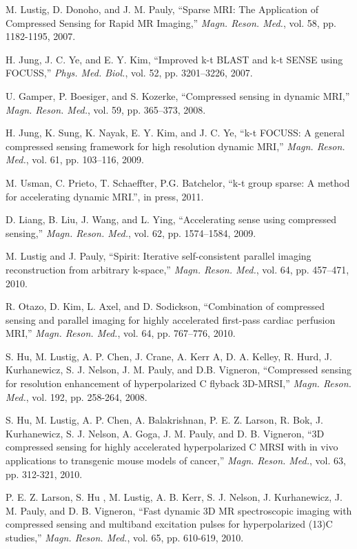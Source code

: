 \documentclass[10pt,draftcls, onecolumn]{IEEEtran}
\begin{document}
\begin{thebibliography}{}
M. Lustig,  D. Donoho, and J. M. Pauly, ``Sparse MRI: The Application of Compressed Sensing for Rapid MR Imaging,'' \emph{Magn. Reson. Med.}, vol. 58, pp. 1182-1195, 2007.

H. Jung, J. C. Ye, and E. Y. Kim, ``Improved k-t BLAST and k-t SENSE using FOCUSS,'' \emph{Phys. Med. Biol.}, vol. 52, pp. 3201–3226, 2007.

U. Gamper, P. Boesiger, and S. Kozerke, ``Compressed sensing in dynamic MRI,'' \emph{Magn. Reson. Med.}, vol. 59, pp. 365–373, 2008.

H. Jung, K. Sung, K. Nayak, E. Y. Kim, and J. C. Ye, ``k-t FOCUSS: A general compressed sensing framework for high resolution dynamic MRI,'' \emph{Magn. Reson. Med.}, vol. 61, pp. 103–116, 2009.

M. Usman, C. Prieto, T. Schaeffter, P.G. Batchelor, ``k-t group sparse: A method for accelerating dynamic MRI.'', in press, 2011.

D. Liang, B. Liu, J. Wang, and L. Ying, ``Accelerating sense using compressed sensing,'' \emph{Magn. Reson. Med.}, vol. 62, pp. 1574–1584, 2009.

M. Lustig and J. Pauly, ``Spirit: Iterative self-consistent parallel imaging reconstruction from arbitrary k-space,'' \emph{Magn. Reson. Med.}, vol. 64, pp. 457–471, 2010.

R. Otazo, D. Kim, L. Axel, and D. Sodickson, ``Combination of compressed sensing and parallel imaging for highly accelerated first-pass cardiac perfusion MRI,'' \emph{Magn. Reson. Med.}, vol. 64, pp. 767–776, 2010.

S. Hu, M. Lustig, A. P. Chen, J. Crane, A. Kerr A, D. A. Kelley, R. Hurd, J. Kurhanewicz, S. J. Nelson, J. M. Pauly, and D.B. Vigneron, ``Compressed sensing for resolution enhancement of hyperpolarized C flyback 3D-MRSI,'' \emph{Magn. Reson. Med.}, vol. 192, pp. 258-264, 2008.

S. Hu, M. Lustig, A. P. Chen, A. Balakrishnan, P. E. Z. Larson, R. Bok, J. Kurhanewicz, S. J. Nelson, A. Goga, J. M. Pauly, and D. B. Vigneron, ``3D compressed sensing for highly accelerated hyperpolarized C MRSI with in vivo applications to transgenic mouse models of cancer,'' \emph{Magn. Reson. Med.}, vol. 63, pp. 312-321, 2010.

P. E. Z. Larson, S. Hu , M. Lustig, A. B. Kerr, S. J. Nelson, J. Kurhanewicz, J. M. Pauly, and D. B. Vigneron, ``Fast dynamic 3D MR spectroscopic imaging with compressed sensing and multiband excitation pulses for hyperpolarized (13)C studies,'' \emph{Magn. Reson. Med.}, vol. 65, pp. 610-619, 2010.


\end{thebibliography}
\end{document}
